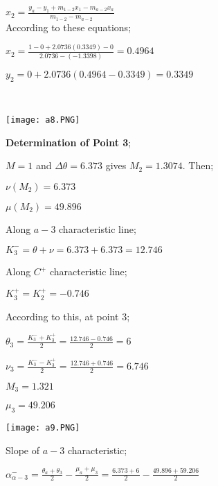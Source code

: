 \begin{appendices}
\begin{minipage}{0.65\textwidth}
	$x_2=\frac{y_a-y_1+m_{1-2}x_1-m_{a-2}x_a}{m_{1-2}-m_{a-2}}$\\
	
	According to these equations;\\
	
	{\color{magenta}
		$x_2 = \frac{1-0+2.0736(0.3349)-0}{2.0736-(-1.3398)} = 0.4964 $
		
		$y_2 = 0+2.0736(0.4964-0.3349)=0.3349$
	}\\
	
\end{minipage}
\begin{minipage}{0.35\textwidth}
	\texttt{[image: a8.PNG]}
\end{minipage}%
\noindent

\noindent\textbf{Determination of Point 3};\\

\begin{minipage}{0.65\textwidth}
	
	$M=1$ and $\Delta\theta = 6.373$ gives $M_2=1.3074$. Then;
	
	$\nu(M_2)=6.373$
	
	$\mu(M_2)=49.896$
	
	Along $a-3$ characteristic line;
	
	$K_3^- = \theta + \nu = 6.373 + 6.373 = 12.746$
	
	Along $C^+$ characteristic line;
	
	$K_3^+ = K_2^+ = -0.746$
	
	According to this, at point $3$;
	
	$\theta_3 = \frac{K_3^-+K_3^+}{2} = \frac{12.746-0.746}{2} = 6$
	
	$\nu_3 = \frac{K_3^--K_3^+}{2} = \frac{12.746+0.746}{2} = 6.746$
	
	$M_3 = 1.321$
	
	$\mu_3 = 49.206$\\
	
\end{minipage}
\begin{minipage}{0.35\textwidth}
	\texttt{[image: a9.PNG]}
\end{minipage}%
\noindent

Slope of $a-3$ characteristic;

${\alpha}^{-}_{\alpha-3} = \frac{\theta_a+\theta_3}{2}-\frac{\mu_a+\mu_3}{2} = \frac{6.373+6}{2}-\frac{49.896+59.206}{2}$


\end{appendices}
